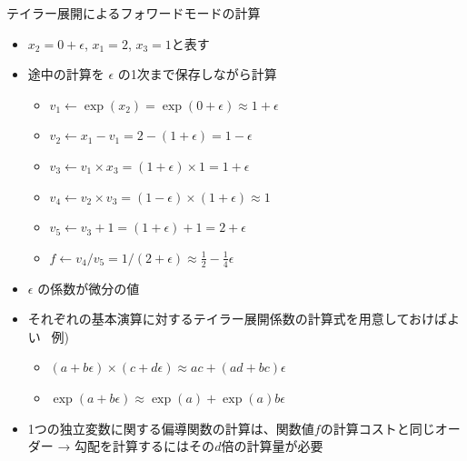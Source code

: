 \begin{frame}[t,fragile]{テイラー展開によるフォワードモードの計算}
  \begin{itemize}
  \item $x_2 = 0 + \epsilon$, $x_1 = 2$, $x_3 = 1$と表す
  \item 途中の計算を $\epsilon$ の1次まで保存しながら計算
    \begin{itemize}
    \item $v_1 \leftarrow \exp(x_2) = \exp(0 + \epsilon) \approx 1 + \epsilon$
    \item $v_2 \leftarrow x_1 - v_1 = 2 - (1 + \epsilon) = 1 - \epsilon$
    \item $v_3 \leftarrow v_1 \times x_3 = (1 + \epsilon) \times 1 = 1 + \epsilon$
    \item $v_4 \leftarrow v_2 \times v_3 = (1 - \epsilon) \times (1 + \epsilon) \approx 1$
    \item $v_5 \leftarrow v_3 + 1 = (1 + \epsilon) + 1 = 2 + \epsilon$
    \item $f \leftarrow v_4 / v_5 = 1 / (2 + \epsilon) \approx \frac{1}{2} - \frac{1}{4} \epsilon$
    \end{itemize}
  \item $\epsilon$ の係数が微分の値
  \item それぞれの基本演算に対するテイラー展開係数の計算式を用意しておけばよい \ 例)
    \begin{itemize}
    \item $(a + b \epsilon) \times (c + d \epsilon) \approx ac + (ad + bc) \epsilon$
    \item $\exp(a+b\epsilon) \approx \exp(a) + \exp(a) b \epsilon$
    \end{itemize}
  \item 1つの独立変数に関する偏導関数の計算は、関数値$f$の計算コストと同じオーダー → 勾配を計算するにはその$d$倍の計算量が必要


\end{itemize}
\end{frame}
